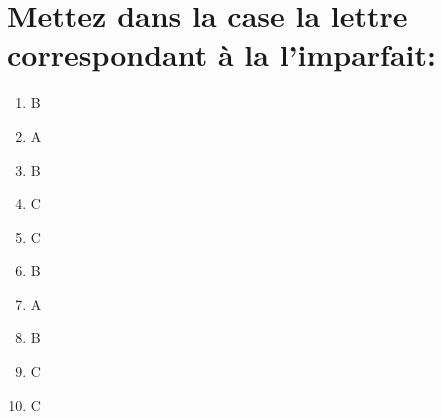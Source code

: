 \section{Mettez dans la case la lettre correspondant à la l'imparfait:}

\begin{enumerate}
    \item B
    \item A
    \item B
    \item C
    \item C
    \item B
    \item A
    \item B
    \item C
    \item C
\end{enumerate}